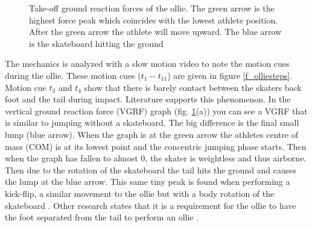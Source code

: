 \documentclass[default,iicol]{sn-jnl}
\begin{document}
\begin{figure}[b]

\caption[Ollie vertical ground reaction force]{Take-off ground reaction forces
of the ollie. The green arrow is the highest force peak which coincides with
the lowest athlete position. After the green arrow the athlete will move
upward. The blue arrow is the skateboard hitting the ground
\cite{frederick_biomechanics_2006}}
\label{f_GRF}
\end{figure}

The mechanics is analyzed with a slow motion video to note the motion cues
during the ollie. These motion cues ($t_1-t_{11}$) are given in figure
\ref{f_olliesteps}. Motion cue $t_3$ and $t_4$ show that there is barely
contact between the skaters back foot and the tail during impact. Literature
supports this phenomenon. In the vertical ground reaction force (VGRF) graph
(fig. \ref{f_GRF}(a)) you can see a VGRF that is similar to jumping without a
skateboard. The big difference is the final small lump (blue arrow). When the
graph is at the green arrow the athletes centre of mass (COM) is at its lowest
point and the concentric jumping phase starts. Then when the graph has fallen
to almost 0, the skater is weightless and thus airborne. Then due to the
rotation of the skateboard the tail hits the ground and causes the lump at the
blue arrow. This same tiny peak is found when performing a kick-flip, a similar
movement to the ollie but with a body rotation of the skateboard
\cite{determan_kinetics_2006}. Other research states that it is a requirement
for the ollie to have the foot separated from the tail to perform an ollie
\cite{nakashima_simulation_2021}.
\end{document}
